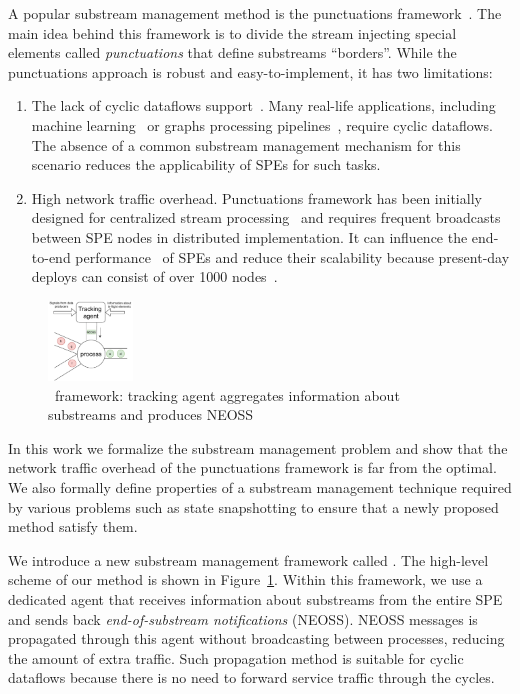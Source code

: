 A popular substream management method is the punctuations framework~\cite{tucker2003exploiting}. The main idea behind this framework is to divide the stream injecting special elements called {\em punctuations} that define substreams ``borders''. While the punctuations approach is robust and easy-to-implement, it has two limitations:
\begin{enumerate}
    \item The lack of cyclic dataflows support~\cite{carbone2018scalable}. Many real-life applications, including machine learning~\cite{webirte} or graphs processing pipelines~\cite{xu2018fault}, require cyclic dataflows. The absence of a common substream management mechanism for this scenario reduces the applicability of SPEs for such tasks.
    \item High network traffic overhead. Punctuations framework has been initially designed for centralized stream processing~\cite{Tucker:2003:EPS:776752.776780} and requires frequent broadcasts between SPE nodes in distributed implementation. It can influence the end-to-end performance~\cite{DBLP:journals/pvldb/BegoliACHKKMS21} of SPEs and reduce their scalability because present-day deploys can consist of over 1000 nodes~\cite{Carbone:2017:SMA:3137765.3137777}. 
\end{enumerate}

\begin{figure}[t]
  \centering
  \includegraphics[width=0.20\textwidth]{pics/tracker-scheme.pdf}
  \caption{\tracker\ framework: tracking agent aggregates information about substreams and produces NEOSS}
  \label{tracker_scheme}
\end{figure}

In this work we formalize the substream management problem and show that the network traffic overhead of the punctuations framework is far from the optimal. We also formally define properties of a substream management technique required by various problems such as state snapshotting to ensure that a newly proposed method satisfy them. 

We introduce a new substream management framework called \tracker. The high-level scheme of our method is shown in Figure~\ref{tracker_scheme}. Within this framework, we use a dedicated agent that receives information about substreams from the entire SPE and sends back {\em end-of-substream notifications} (NEOSS). NEOSS messages is propagated through this agent without broadcasting between processes, reducing the amount of extra traffic. Such propagation method is suitable for cyclic dataflows because there is no need to forward service traffic through the cycles.

